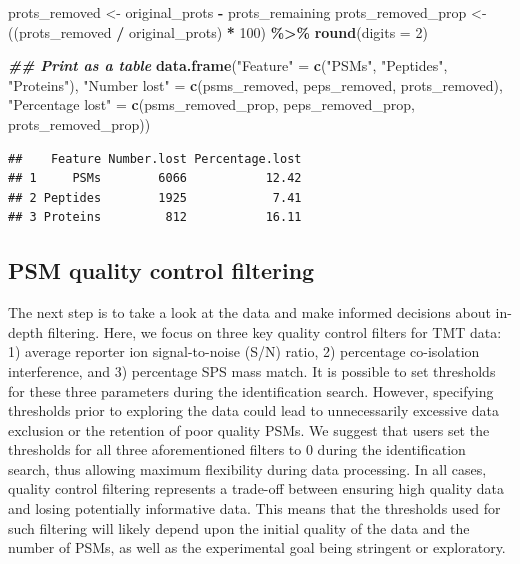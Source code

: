 \documentclass[9pt,a4paper,]{extarticle}
\newenvironment{Shaded}{\begin{snugshade}}{\end{snugshade}}
\newcommand{\AttributeTok}[1]{\textcolor[rgb]{0.13,0.29,0.53}{#1}}
\newcommand{\DecValTok}[1]{\textcolor[rgb]{0.00,0.00,0.81}{#1}}
\newcommand{\DocumentationTok}[1]{\textcolor[rgb]{0.56,0.35,0.01}{\textbf{\textit{#1}}}}
\newcommand{\FunctionTok}[1]{\textcolor[rgb]{0.13,0.29,0.53}{\textbf{#1}}}
\newcommand{\NormalTok}[1]{#1}
\newcommand{\OtherTok}[1]{\textcolor[rgb]{0.56,0.35,0.01}{#1}}
\newcommand{\SpecialCharTok}[1]{\textcolor[rgb]{0.81,0.36,0.00}{\textbf{#1}}}
\newcommand{\StringTok}[1]{\textcolor[rgb]{0.31,0.60,0.02}{#1}}
\begin{document}
\begin{Shaded}
\begin{Highlighting}[]
\NormalTok{prots\_removed }\OtherTok{\textless{}{-}}\NormalTok{ original\_prots }\SpecialCharTok{{-}}\NormalTok{ prots\_remaining}
\NormalTok{prots\_removed\_prop }\OtherTok{\textless{}{-}}\NormalTok{ ((prots\_removed }\SpecialCharTok{/}\NormalTok{ original\_prots) }\SpecialCharTok{*} \DecValTok{100}\NormalTok{) }\SpecialCharTok{\%\textgreater{}\%}
  \FunctionTok{round}\NormalTok{(}\AttributeTok{digits =} \DecValTok{2}\NormalTok{)}
\end{Highlighting}
\end{Shaded}

\begin{Shaded}
\begin{Highlighting}[]
\DocumentationTok{\#\# Print as a table}
\FunctionTok{data.frame}\NormalTok{(}\StringTok{"Feature"} \OtherTok{=} \FunctionTok{c}\NormalTok{(}\StringTok{"PSMs"}\NormalTok{,}
                         \StringTok{"Peptides"}\NormalTok{,}
                         \StringTok{"Proteins"}\NormalTok{),}
           \StringTok{"Number lost"} \OtherTok{=} \FunctionTok{c}\NormalTok{(psms\_removed,}
\NormalTok{                             peps\_removed,}
\NormalTok{                             prots\_removed),}
           \StringTok{"Percentage lost"} \OtherTok{=} \FunctionTok{c}\NormalTok{(psms\_removed\_prop,}
\NormalTok{                                 peps\_removed\_prop,}
\NormalTok{                                 prots\_removed\_prop))}
\end{Highlighting}
\end{Shaded}

\begin{verbatim}
##    Feature Number.lost Percentage.lost
## 1     PSMs        6066           12.42
## 2 Peptides        1925            7.41
## 3 Proteins         812           16.11
\end{verbatim}

\subsection{PSM quality control filtering}\label{psm-quality-control-filtering}

The next step is to take a look at the data and make informed decisions about
in-depth filtering. Here, we focus on three key quality control filters for TMT
data: 1) average reporter ion signal-to-noise (S/N) ratio, 2) percentage
co-isolation interference, and 3) percentage SPS mass match. It is possible to
set thresholds for these three parameters during the identification search.
However, specifying thresholds prior to exploring the data could lead to
unnecessarily excessive data exclusion or the retention of poor quality PSMs. We
suggest that users set the thresholds for all three aforementioned filters to 0
during the identification search, thus allowing maximum flexibility during data
processing. In all cases, quality control filtering represents a trade-off
between ensuring high quality data and losing potentially informative data. This
means that the thresholds used for such filtering will likely depend upon the
initial quality of the data and the number of PSMs, as well as the experimental
goal being stringent or exploratory.
\end{document}
